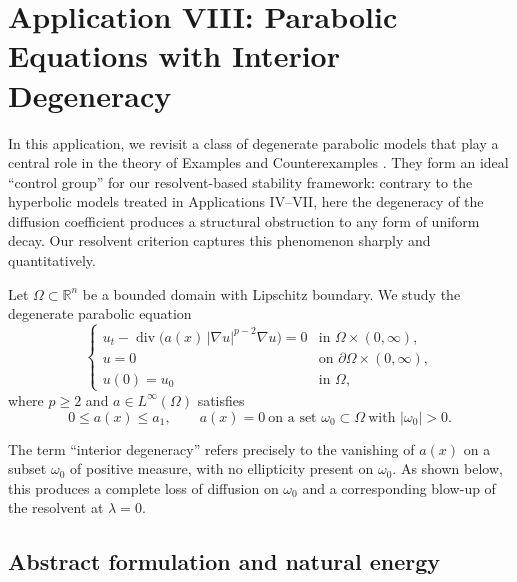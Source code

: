 \documentclass[11pt,reqno]{amsart}
\theoremstyle{remark}
\begin{document}






\section{Application VIII: Parabolic Equations with Interior Degeneracy}
\label{sec:degenerate_parabolic}

In this application, we revisit a class of degenerate parabolic models that play a central role in the theory of Examples and Counterexamples \cite{Examples2022}.
They form an ideal ``control group'' for our resolvent-based stability framework:
contrary to the hyperbolic models treated in Applications IV--VII, here the degeneracy of the diffusion coefficient produces a structural obstruction to any form of uniform decay.
Our resolvent criterion captures this phenomenon sharply and quantitatively.

Let $\Omega\subset\mathbb{R}^n$ be a bounded domain with Lipschitz boundary.
We study the degenerate parabolic equation
\begin{equation} \label{eq:deg_parab}
\begin{cases}
u_t - \operatorname{div}\!\bigl(a(x)\,|\nabla u|^{p-2}\nabla u\bigr)=0
    &\text{in } \Omega\times(0,\infty),\\[1mm]
u=0 &\text{on } \partial\Omega\times(0,\infty),\\[1mm]
u(0)=u_0 &\text{in } \Omega,
\end{cases}
\end{equation}
where $p\ge2$ and $a\in L^\infty(\Omega)$ satisfies
\[
0\le a(x)\le a_1,
\qquad
a(x)=0\ \text{on a set }\omega_0\subset\Omega\ \text{with }|\omega_0|>0.
\]

The term ``interior degeneracy'' refers precisely to the vanishing of $a(x)$ on
a subset $\omega_0$ of positive measure, with no ellipticity present on $\omega_0$.
As shown below, this produces a complete loss of diffusion on $\omega_0$
and a corresponding blow-up of the resolvent at $\lambda=0$.

\subsection{Abstract formulation and natural energy}
\end{document}
